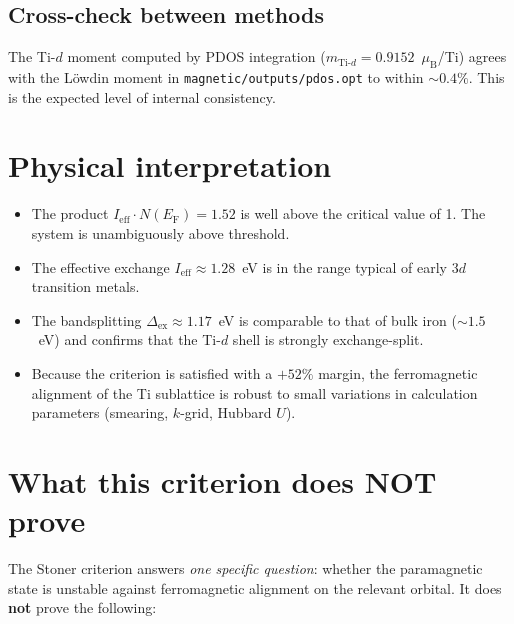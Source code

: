\documentclass[11pt,a4paper]{article}
\newcommand{\Ef}{E_{\mathrm{F}}}
\newcommand{\Tid}{\text{Ti-}d}
\newcommand{\Dex}{\Delta_{\text{ex}}}
\newcommand{\Ieff}{I_{\text{eff}}}
\newcommand{\NEf}{N(\Ef)}
\begin{document}
\subsection{Cross-check between methods}

The Ti-$d$ moment computed by PDOS integration
($m_{\Tid} = 0.9152$~$\mu_{\text{B}}$/Ti) agrees with the Löwdin moment
in \texttt{magnetic/outputs/pdos.opt} to within $\sim 0.4\%$. This is
the expected level of internal consistency.

\section{Physical interpretation}

\begin{itemize}[itemsep=2pt]
    \item The product $\Ieff \cdot \NEf = 1.52$ is well above the
          critical value of 1. The system is unambiguously above
          threshold.
    \item The effective exchange $\Ieff \approx 1.28$~eV is in the range
          typical of early 3$d$ transition metals.
    \item The bandsplitting $\Dex \approx 1.17$~eV is comparable to that
          of bulk iron ($\sim 1.5$~eV) and confirms that the Ti-$d$
          shell is strongly exchange-split.
    \item Because the criterion is satisfied with a $+52\%$ margin, the
          ferromagnetic alignment of the Ti sublattice is robust to
          small variations in calculation parameters (smearing,
          $k$-grid, Hubbard $U$).
\end{itemize}

\section{What this criterion does NOT prove}

The Stoner criterion answers \emph{one specific question}: whether the
paramagnetic state is unstable against ferromagnetic alignment on the
relevant orbital. It does \textbf{not} prove the following:
\end{document}
